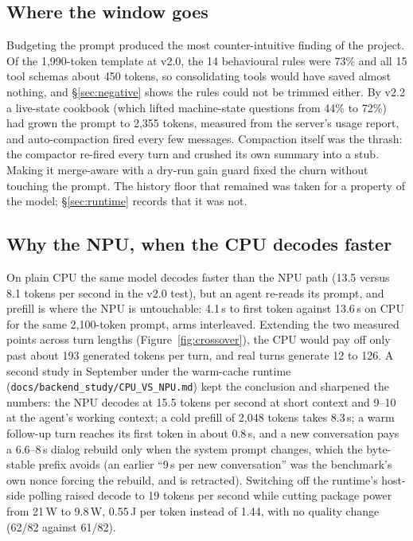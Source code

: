 \documentclass[11pt]{article}
\newcommand{\code}[1]{\texttt{\small #1}}
\begin{document}
\subsection{Where the window goes}\label{sec:window}

Budgeting the prompt produced the most counter-intuitive finding of the
project. Of the 1{,}990-token template at v2.0, the 14 behavioural rules were
73\% and all 15 tool schemas about 450 tokens, so consolidating tools would
have saved almost nothing, and \S\ref{sec:negative} shows the rules could not
be trimmed either. By v2.2 a live-state cookbook (which lifted machine-state
questions from 44\% to 72\%) had grown the prompt to 2{,}355 tokens, measured
from the server's usage report, and auto-compaction fired every few messages.
Compaction itself was the thrash: the compactor re-fired every turn and
crushed its own summary into a stub. Making it merge-aware with a dry-run
gain guard fixed the churn without touching the prompt. The history floor
that remained was taken for a property of the model; \S\ref{sec:runtime}
records that it was not.

\subsection{Why the NPU, when the CPU decodes faster}

On plain CPU the same model decodes faster than the NPU path (13.5 versus
8.1 tokens per second in the v2.0 test), but an agent re-reads its prompt,
and prefill is where the NPU is untouchable: 4.1\,s to first token against
13.6\,s on CPU for the same 2{,}100-token prompt, arms interleaved. Extending
the two measured points across turn lengths (Figure~\ref{fig:crossover}), the
CPU would pay off only past about 193 generated tokens per turn, and real
turns generate 12 to 126. A second study in September under the warm-cache
runtime (\code{docs/backend\_study/CPU\_VS\_NPU.md}) kept the conclusion and
sharpened the numbers: the NPU decodes at 15.5 tokens per second at short
context and 9--10 at the agent's working context; a cold prefill of 2{,}048
tokens takes 8.3\,s; a warm follow-up turn reaches its first token in about
0.8\,s, and a new conversation pays a 6.6--8\,s dialog rebuild only when the
system prompt changes, which the byte-stable prefix avoids (an earlier
``9\,s per new conversation'' was the benchmark's own nonce forcing the
rebuild, and is retracted). Switching off the runtime's host-side polling
raised decode to 19 tokens per second while cutting package power from
21\,W to 9.8\,W, 0.55\,J per token instead of 1.44, with no quality change
(62/82 against 61/82).
\end{document}
